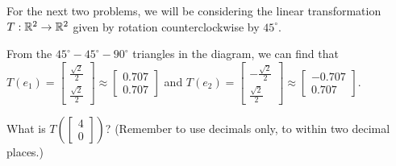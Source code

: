 


For the next two problems, we will be considering the linear transformation $T: \mathbb R^2 \rightarrow \mathbb R^2$
given by rotation counterclockwise by $45^\circ$.  


\begin{center}
 

\end{center}


From the $45^\circ-45^\circ-90^\circ$ triangles in the diagram, we can find that  
$T(e_1) = \left[ \begin{array}{c} \frac{\sqrt{2}}{2} \\ \frac{\sqrt{2}}{2}  \end{array} \right] \approx
\left[ \begin{array}{c} 0.707 \\ 0.707 \end{array} \right]$ and
$T(e_2) = \left[ \begin{array}{c} -\frac{\sqrt{2}}{2} \\ \frac{\sqrt{2}}{2}  \end{array} \right] \approx
\left[ \begin{array}{c} -0.707 \\ 0.707  \end{array} \right].$   

What is $T\left( \left[ \begin{array}{c} 4 \\ 0 \end{array} \right] \right)$?  (Remember to use decimals only, to within two decimal places.)  







